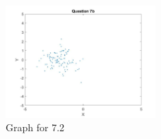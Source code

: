 \documentclass[a4paper]{article}
\theoremstyle{definition}
\newenvironment{soln}{
	\leavevmode\color{blue}\ignorespaces
}{}
\begin{document}
\begin{enumerate}
		\begin{soln}
		\\
		 \begin{figure}[h!]
		     \centering
		     \includegraphics[width=0.5\textwidth]{hw1/2dnorm_b.jpg}  
		     \captionsetup{labelformat=empty}
		     \caption{Graph for 7.2}
		     \label{fig:my_label5}
		 \end{figure}
	\end{soln}
	\end{enumerate}
	
	
	
	
	
	
	
\end{document}
